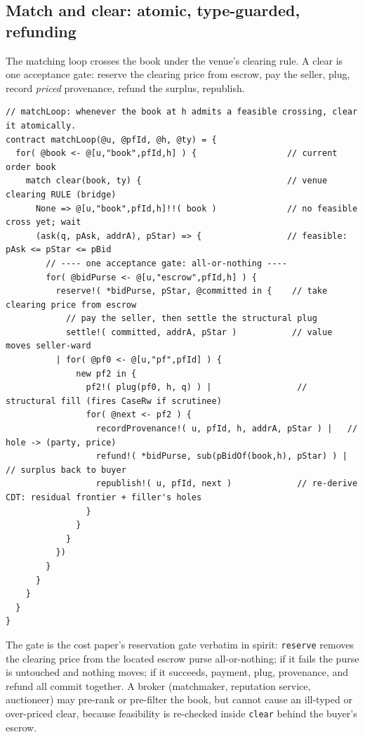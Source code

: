 \documentclass[11pt]{article}
\theoremstyle{definition}
\begin{document}
\subsection{Match and clear: atomic, type-guarded, refunding}
The matching loop crosses the book under the venue's clearing rule. A clear is one acceptance gate:
reserve the clearing price from escrow, pay the seller, plug, record \emph{priced} provenance, refund
the surplus, republish.

\begin{lstlisting}
// matchLoop: whenever the book at h admits a feasible crossing, clear it atomically.
contract matchLoop(@u, @pfId, @h, @ty) = {
  for( @book <- @[u,"book",pfId,h] ) {                  // current order book
    match clear(book, ty) {                             // venue clearing RULE (bridge)
      None => @[u,"book",pfId,h]!!( book )              // no feasible cross yet; wait
      (ask(q, pAsk, addrA), pStar) => {                 // feasible: pAsk <= pStar <= pBid
        // ---- one acceptance gate: all-or-nothing ----
        for( @bidPurse <- @[u,"escrow",pfId,h] ) {
          reserve!( *bidPurse, pStar, @committed in {    // take clearing price from escrow
            // pay the seller, then settle the structural plug
            settle!( committed, addrA, pStar )           // value moves seller-ward
          | for( @pf0 <- @[u,"pf",pfId] ) {
              new pf2 in {
                pf2!( plug(pf0, h, q) ) |                 // structural fill (fires CaseRw if scrutinee)
                for( @next <- pf2 ) {
                  recordProvenance!( u, pfId, h, addrA, pStar ) |   // hole -> (party, price)
                  refund!( *bidPurse, sub(pBidOf(book,h), pStar) ) | // surplus back to buyer
                  republish!( u, pfId, next )             // re-derive CDT: residual frontier + filler's holes
                }
              }
            }
          })
        }
      }
    }
  }
}
\end{lstlisting}

\noindent The gate is the cost paper's reservation gate verbatim in spirit: \texttt{reserve} removes
the clearing price from the located escrow purse all-or-nothing; if it fails the purse is untouched
and nothing moves; if it succeeds, payment, plug, provenance, and refund all commit together. A
broker (matchmaker, reputation service, auctioneer) may pre-rank or pre-filter the book, but cannot
cause an ill-typed or over-priced clear, because feasibility is re-checked inside \texttt{clear}
behind the buyer's escrow.
\end{document}
